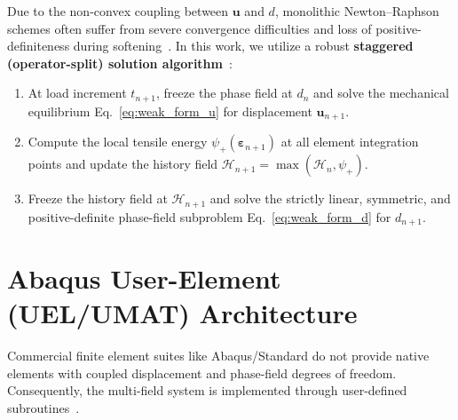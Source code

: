 Due to the non-convex coupling between $\mathbf{u}$ and $d$, monolithic Newton--Raphson schemes often suffer from severe convergence difficulties and loss of positive-definiteness during softening~\cite{ambati2015,farrell2017}. In this work, we utilize a robust \textbf{staggered (operator-split) solution algorithm}~\cite{bourdin2000,miehe2010b,molnar2017}:
\begin{enumerate}
    \item At load increment $t_{n+1}$, freeze the phase field at $d_n$ and solve the mechanical equilibrium Eq.~\eqref{eq:weak_form_u} for displacement $\mathbf{u}_{n+1}$.
    \item Compute the local tensile energy $\psi_+(\boldsymbol{\varepsilon}_{n+1})$ at all element integration points and update the history field $\mathcal{H}_{n+1} = \max(\mathcal{H}_n, \psi_+)$.
    \item Freeze the history field at $\mathcal{H}_{n+1}$ and solve the strictly linear, symmetric, and positive-definite phase-field subproblem Eq.~\eqref{eq:weak_form_d} for $d_{n+1}$.
\end{enumerate}


\section{Abaqus User-Element (UEL/UMAT) Architecture}
\label{sec:theory_uel_architecture}

Commercial finite element suites like Abaqus/Standard do not provide native elements with coupled displacement and phase-field degrees of freedom. Consequently, the multi-field system is implemented through user-defined subroutines~\cite{molnar2017,msekh2015,diddige2025}.

